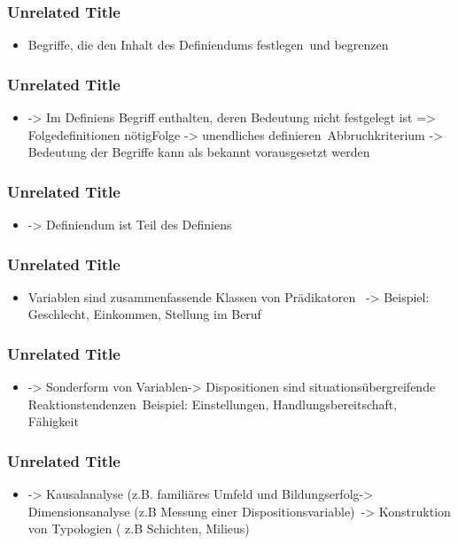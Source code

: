 \documentclass{beamer}
\begin{document}
\begin{frame}
\frametitle{Unrelated Title}


\begin{itemize}
\item Begriffe, die den Inhalt des Definiendums festlegen und begrenzen
\end{itemize}

\note[item]{}
\end{frame}
\begin{frame}
\frametitle{Unrelated Title}


\begin{itemize}
\item -> Im Definiens Begriff enthalten, deren Bedeutung nicht festgelegt ist => Folgedefinitionen nötigFolge -> unendliches definieren Abbruchkriterium -> Bedeutung der Begriffe kann als bekannt vorausgesetzt werden
\end{itemize}

\note[item]{}
\end{frame}
\begin{frame}
\frametitle{Unrelated Title}


\begin{itemize}
\item -> Definiendum ist Teil des Definiens 
\end{itemize}

\note[item]{}
\end{frame}
\begin{frame}
\frametitle{Unrelated Title}


\begin{itemize}
\item Variablen sind zusammenfassende Klassen von Prädikatoren  -> Beispiel: Geschlecht, Einkommen, Stellung im Beruf 
\end{itemize}

\note[item]{}
\end{frame}
\begin{frame}
\frametitle{Unrelated Title}


\begin{itemize}
\item -> Sonderform von Variablen-> Dispositionen sind situationsübergreifende Reaktionstendenzen Beispiel: Einstellungen, Handlungsbereitschaft, Fähigkeit 
\end{itemize}

\note[item]{}
\end{frame}
\begin{frame}
\frametitle{Unrelated Title}


\begin{itemize}
\item -> Kausalanalyse (z.B. familiäres Umfeld und Bildungserfolg-> Dimensionsanalyse (z.B Messung einer Dispositionsvariable) -> Konstruktion von Typologien ( z.B Schichten, Milieus) 
\end{itemize}

\note[item]{}
\end{frame}
\end{document}
